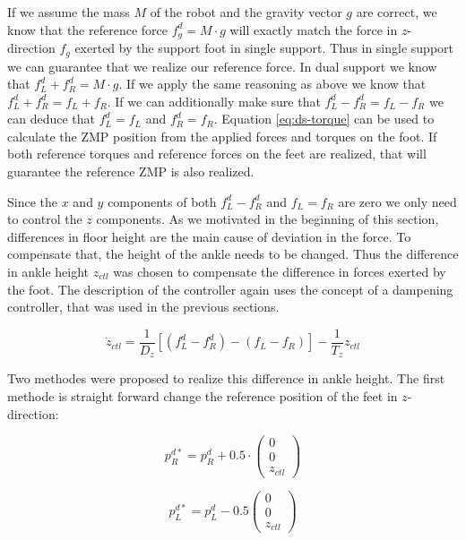 \documentclass[english,ngerman]{KITreprt}
\newcommand{\clr}[2]{{\color{#1}{#2}}}
\newcommand{\todo}[1]{\marginpar{\clr{red}{#1}}}
\begin{document}
If we assume the mass $M$ of the robot and the gravity vector $g$ are
correct, we know that the reference force $f^d_g = M \cdot g$ will
exactly match the force in $z$-direction $f_g$ exerted by the support
foot in single support. Thus in single support we can guarantee that we
realize our reference force. In dual support we know that
$f^d_L + f^d_R = M \cdot g$. If we apply the same reasoning as above we
know that $f^d_L + f^d_R = f_L + f_R$. If we can additionally make sure
that $f^d_L - f^d_R = f_L - f_R$ we can deduce that $f^d_L = f_L$ and
$f^d_R = f_R$. Equation \ref{eq:ds-torque} can be used to calculate the
ZMP position from the applied forces and torques on the foot. If both
reference torques and reference forces on the feet are realized, that
will guarantee the reference ZMP is also realized.

\todo{The code of that part was broken: Fix it.} Since the $x$ and $y$
components of both $f^d_L - f^d_R$ and $f_L = f_R$ are zero we only need
to control the $z$ components. As we motivated in the beginning of this
section, differences in floor height are the main cause of deviation in
the force. To compensate that, the height of the ankle needs to be
changed. Thus the difference in ankle height $z_{ctl}$ was chosen to
compensate the difference in forces exerted by the foot. The description
of the controller again uses the concept of a dampening controller, that
was used in the previous sections.

\begin{equation}
\dot{z}_{ctl} = \frac{1}{D_z} [(f^d_L - f^d_R) - (f_L - f_R)] - \frac{1}{T_z} z_{ctl}
\end{equation}

Two methodes were proposed to realize this difference in ankle height.
The first methode is straight forward change the reference position of
the feet in $z$-direction:

\begin{equation}
p^{d*}_R = p^d_R + 0.5 \cdot \left(\begin{array}{c}0 \\ 0 \\ z_{ctl} \end{array}\right)
\end{equation}

\begin{equation}
p^{d*}_L = p^d_L - 0.5 \left(\begin{array}{c}0 \\ 0 \\ z_{ctl} \end{array}\right)
\end{equation}
\end{document}
